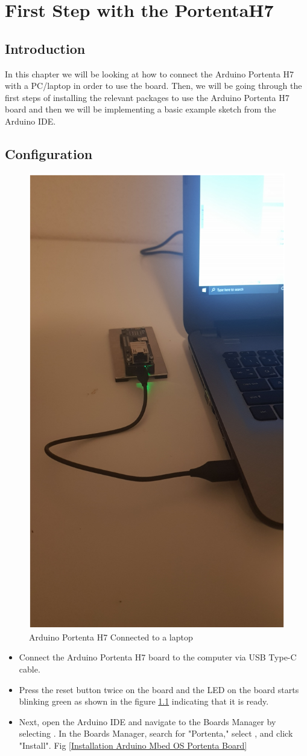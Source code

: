 \chapter{First Step with the PortentaH7}

\section{Introduction}
In this chapter we will be looking at how to connect the Arduino Portenta H7 with a PC/laptop in order to use the board. Then, we will be going through the first steps of installing the relevant packages to use the Arduino Portenta H7 board and then we will be implementing a basic example sketch from the Arduino IDE. \cite{portentaSetup:2024}

\section{Configuration}
\begin{figure}
	\begin{center}
		\includegraphics[width=0.3\linewidth]{Images/ArduinoIDE/ArduinoPortentaH7Connectedtoalaptop.png}
		\caption{Arduino Portenta H7 Connected to a laptop}
		\label{ConnetedtoLaptop}
	\end{center}
\end{figure}
\begin{itemize}
	\item Connect the Arduino Portenta H7 board to the computer via USB Type-C cable.
	\item  Press the reset button twice on the board and the LED on the board starts blinking green as shown in the figure \ref{ConnetedtoLaptop} indicating that it is ready.
	\item Next, open the Arduino IDE and navigate to the Boards Manager by selecting . In the Boards Manager, search for "Portenta," select , and click "Install". Fig \ref{Installation Arduino Mbed OS Portenta Board} 
\end{itemize} 
	
